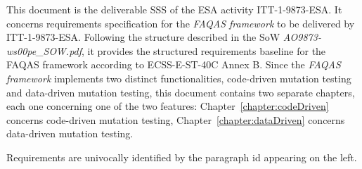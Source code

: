 








This document is the deliverable SSS of the ESA activity ITT-1-9873-ESA. It concerns requirements specification for the \emph{FAQAS framework} to be delivered by ITT-1-9873-ESA. Following the structure described in the SoW \emph{AO9873-ws00pe\_SOW.pdf}, it provides the structured requirements baseline for the FAQAS framework according to ECSS-E-ST-40C Annex B. Since the \emph{FAQAS framework} implements two distinct functionalities, code-driven mutation testing and data-driven mutation testing, this document contains two separate chapters, each one concerning one of the two features: Chapter~\ref{chapter:codeDriven} concerns code-driven mutation testing, Chapter~\ref{chapter:dataDriven} concerns data-driven mutation testing.


Requirements are univocally identified by the paragraph id appearing on the left.
 
 
 


